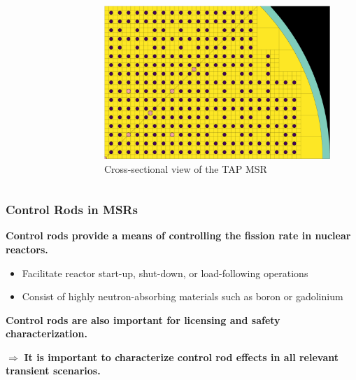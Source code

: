 \begin{frame}
\begin{columns}
\begin{figure}
{      \cite{liu_sensitivityuncertainty_2020}}
    \end{figure}
    \begin{figure}
      \centering
      \includegraphics[width=.5\columnwidth]{images/tap-msr-rods}
      \caption{\footnotesize Cross-sectional view of the TAP MSR \cite{lee_neutronics_2020}}
    \end{figure}
    \hfill
  \end{columns}
\end{frame}

\begin{frame}
  \frametitle{Control Rods in MSRs}
  \textbf{Control rods provide a means of controlling the fission rate in nuclear reactors.} 
  \begin{itemize}
    \item Facilitate reactor start-up, shut-down, or load-following operations
    \item Consist of highly neutron-absorbing materials such as boron or gadolinium
  \end{itemize}
  \textbf{Control rods are also important for licensing and safety characterization.}
  \vspace{.2cm}

  $\Rightarrow$ \textbf{It is important to characterize control rod effects in all relevant
  transient scenarios.}

\end{frame}

